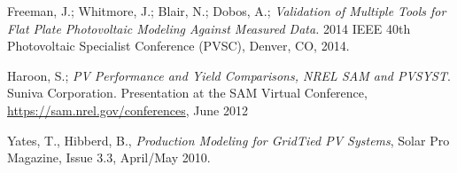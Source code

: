 \documentclass[twocolumn,10pt]{asme2ej}
\begin{document}
\begin{thebibliography}{8}
 Freeman, J.; Whitmore, J.; Blair, N.; Dobos, A.; \emph{Validation of Multiple Tools for Flat Plate Photovoltaic Modeling Against Measured Data.} 2014 IEEE 40th Photovoltaic Specialist Conference (PVSC), Denver, CO, 2014.

 Haroon, S.; \emph{PV Performance and Yield Comparisons, NREL SAM and PVSYST}. Suniva Corporation. Presentation at the SAM Virtual Conference, \url{https://sam.nrel.gov/conferences}, June 2012

 Yates, T., Hibberd, B., \emph{Production Modeling for GridTied PV Systems}, Solar Pro Magazine, Issue 3.3, April/May 2010. 




\end{thebibliography}
\end{document}
